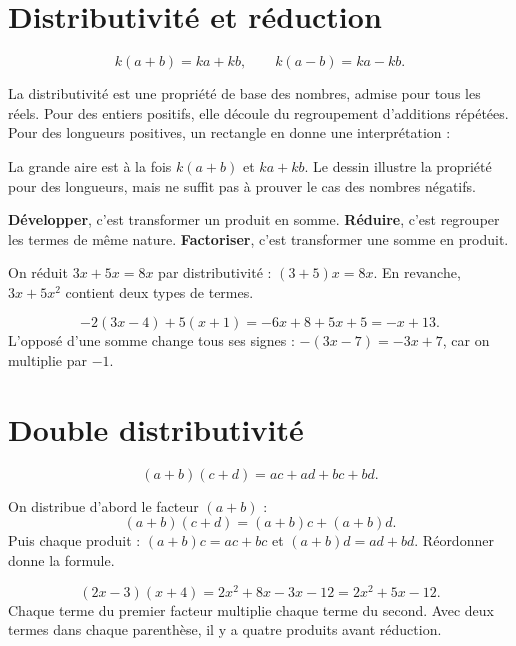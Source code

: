 \documentclass[../cours_3e.tex]{subfiles}
\begin{document}
\section{Distributivité et réduction}
\begin{propriete}
\[k(a+b)=ka+kb,\qquad k(a-b)=ka-kb.\]
\end{propriete}
La distributivité est une propriété de base des nombres, admise pour tous les réels. Pour des entiers positifs, elle découle du regroupement d'additions répétées. Pour des longueurs positives, un rectangle en donne une interprétation :
\begin{center}
\end{center}
La grande aire est à la fois $k(a+b)$ et $ka+kb$. Le dessin illustre la propriété pour des longueurs, mais ne suffit pas à prouver le cas des nombres négatifs.
\begin{definition}
\textbf{Développer}, c'est transformer un produit en somme. \textbf{Réduire}, c'est regrouper les termes de même nature. \textbf{Factoriser}, c'est transformer une somme en produit.
\end{definition}
On réduit $3x+5x=8x$ par distributivité : $(3+5)x=8x$. En revanche, $3x+5x^2$ contient deux types de termes.
\begin{exemple}
\[
-2(3x-4)+5(x+1)=-6x+8+5x+5=-x+13.
\]
L'opposé d'une somme change tous ses signes : $-(3x-7)=-3x+7$, car on multiplie par $-1$.
\end{exemple}
\section{Double distributivité}
\begin{propriete}
\[(a+b)(c+d)=ac+ad+bc+bd.\]
\end{propriete}
\begin{demonstration}
On distribue d'abord le facteur $(a+b)$ :
\[(a+b)(c+d)=(a+b)c+(a+b)d.\]
Puis chaque produit : $(a+b)c=ac+bc$ et $(a+b)d=ad+bd$. Réordonner donne la formule.
\end{demonstration}
\begin{exemple}
\[(2x-3)(x+4)=2x^2+8x-3x-12=2x^2+5x-12.\]
Chaque terme du premier facteur multiplie chaque terme du second. Avec deux termes dans chaque parenthèse, il y a quatre produits avant réduction.
\end{exemple}
\end{document}

